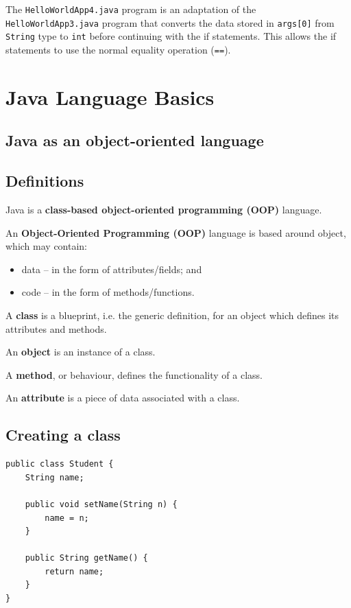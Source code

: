 \documentclass[a4paper]{systems-software}
\begin{document}
The \texttt{HelloWorldApp4.java} program is an adaptation of the \texttt{HelloWorldApp3.java} program that converts the data stored in \texttt{args[0]} from \texttt{String} type to \texttt{int} before continuing with the if statements. This allows the if statements to use the normal equality operation (\texttt{==}).


\chapter{Java Language Basics}

\section{Java as an object-oriented language}

\section*{Definitions}

Java is a \textbf{class-based object-oriented programming (OOP)} language.

An \textbf{Object-Oriented Programming (OOP)} language is based around object, which may contain:
\begin{itemize}
	\item data -- in the form of attributes/fields; and
	\item code -- in the form of methods/functions.
\end{itemize}

A \textbf{class} is a blueprint, i.e. the generic definition, for an object which defines its attributes and methods.

An \textbf{object} is an instance of a class.

A \textbf{method}, or behaviour, defines the functionality of a class.

An \textbf{attribute} is a piece of data associated with a class.


\newpage

\section*{Creating a class}

\begin{lstlisting}[title={Student class.}]
public class Student {
	String name;
	
	public void setName(String n) {
		name = n;
	}
	
	public String getName() {
		return name;
	}
}
\end{lstlisting}
\end{document}
